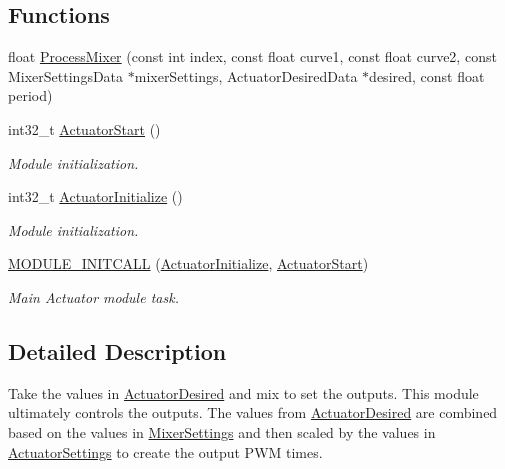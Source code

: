 \subsection*{\-Functions}
\begin{DoxyCompactItemize}
\item 
float \hyperlink{group___actuator_module_ga844186186b03b96244af3ad5e1a88f02}{\-Process\-Mixer} (const int index, const float curve1, const float curve2, const \-Mixer\-Settings\-Data $\ast$mixer\-Settings, \-Actuator\-Desired\-Data $\ast$desired, const float period)
\item 
int32\-\_\-t \hyperlink{group___actuator_module_gacde7d1a4e7c4969a5b11e37315053034}{\-Actuator\-Start} ()
\begin{DoxyCompactList}\small\item\em \-Module initialization. \end{DoxyCompactList}\item 
int32\-\_\-t \hyperlink{group___actuator_module_gaa23ed2bf1c2252218764708ac5d8b2fb}{\-Actuator\-Initialize} ()
\begin{DoxyCompactList}\small\item\em \-Module initialization. \end{DoxyCompactList}\item 
\hyperlink{group___actuator_module_ga3fc102c0bb02fa6b86182b6230765ca5}{\-M\-O\-D\-U\-L\-E\-\_\-\-I\-N\-I\-T\-C\-A\-L\-L} (\hyperlink{group___actuator_module_gaa23ed2bf1c2252218764708ac5d8b2fb}{\-Actuator\-Initialize}, \hyperlink{group___actuator_module_gacde7d1a4e7c4969a5b11e37315053034}{\-Actuator\-Start})
\begin{DoxyCompactList}\small\item\em \-Main \-Actuator module task. \end{DoxyCompactList}\end{DoxyCompactItemize}


\subsection{\-Detailed \-Description}
\-Take the values in \hyperlink{group___actuator_desired}{\-Actuator\-Desired} and mix to set the outputs. \-This module ultimately controls the outputs. \-The values from \hyperlink{group___actuator_desired}{\-Actuator\-Desired} are combined based on the values in \hyperlink{group___mixer_settings}{\-Mixer\-Settings} and then scaled by the values in \hyperlink{group___actuator_settings}{\-Actuator\-Settings} to create the output \-P\-W\-M times. 

